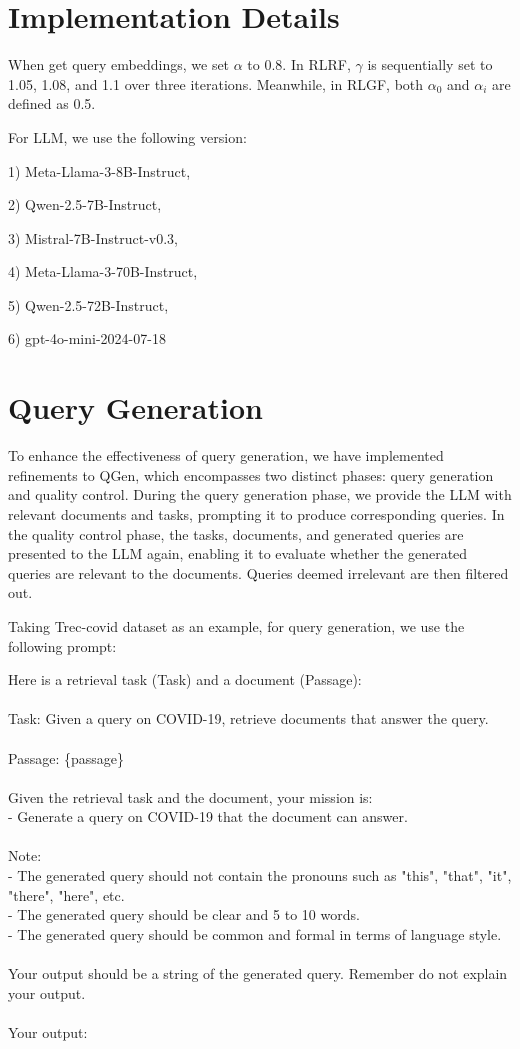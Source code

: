 \clearpage
\newpage
\appendix

\section{Implementation Details}
When get query embeddings, we set $\alpha$ to 0.8. In RLRF, $\gamma$ is sequentially set to 1.05, 1.08, and 1.1 over three iterations. Meanwhile, in RLGF, both $\alpha_0$ and $\alpha_i$ are defined as 0.5.

For LLM, we use the following version:

1) Meta-Llama-3-8B-Instruct, 

2) Qwen-2.5-7B-Instruct, 

3) Mistral-7B-Instruct-v0.3, 

4) Meta-Llama-3-70B-Instruct, 

5) Qwen-2.5-72B-Instruct, 

6) gpt-4o-mini-2024-07-18

\section{Query Generation}
To enhance the effectiveness of query generation, we have implemented refinements to QGen, which encompasses two distinct phases: query generation and quality control.
During the query generation phase, we provide the LLM with relevant documents and tasks, prompting it to produce corresponding queries. In the quality control phase, the tasks, documents, and generated queries are presented to the LLM again, enabling it to evaluate whether the generated queries are relevant to the documents. Queries deemed irrelevant are then filtered out.

Taking Trec-covid dataset as an example, for query generation, we use the following prompt:
\begin{mdframed}[backgroundcolor=gray!20, linecolor=gray]
\small
Here is a retrieval task (Task) and a document (Passage):\\
\\
Task: Given a query on COVID-19, retrieve documents that answer the query.\\
\\
Passage: \{passage\}\\
\\
Given the retrieval task and the document, your mission is:\\
- Generate a query on COVID-19 that the document can answer.\\
\\
Note:\\
- The generated query should not contain the pronouns such as "this", "that", "it", "there", "here", etc.\\
- The generated query should be clear and 5 to 10 words.\\
- The generated query should be common and formal in terms of language style.\\
\\
Your output should be a string of the generated query. Remember do not explain your output.\\
\\
Your output:
\end{mdframed}

